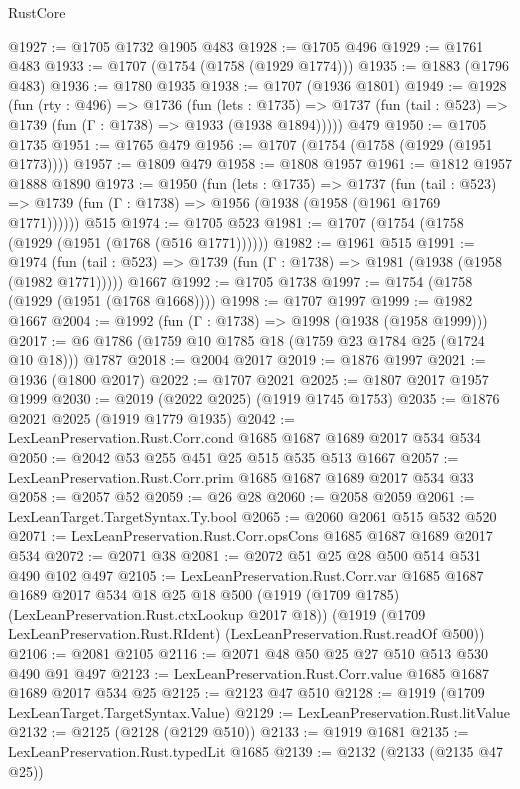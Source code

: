 \begin{lexlean}{RustCore}
\begin{coremodule}
@1927 := @1705 @1732 @1905 @483
@1928 := @1705 @496
@1929 := @1761 @483
@1933 := @1707 (@1754 (@1758 (@1929 @1774)))
@1935 := @1883 (@1796 @483)
@1936 := @1780 @1935
@1938 := @1707 (@1936 @1801)
@1949 := @1928
    (fun (rty : @496) =>
    @1736
      (fun (lets : @1735) =>
      @1737 (fun (tail : @523) => @1739 (fun (Γ : @1738) => @1933 (@1938 @1894)))))
    @479
@1950 := @1705 @1735
@1951 := @1765 @479
@1956 := @1707 (@1754 (@1758 (@1929 (@1951 @1773))))
@1957 := @1809 @479
@1958 := @1808 @1957
@1961 := @1812 @1957 @1888 @1890
@1973 := @1950
    (fun (lets : @1735) =>
    @1737
      (fun (tail : @523) => @1739 (fun (Γ : @1738) => @1956 (@1938 (@1958 (@1961 @1769 @1771))))))
    @515
@1974 := @1705 @523
@1981 := @1707 (@1754 (@1758 (@1929 (@1951 (@1768 (@516 @1771))))))
@1982 := @1961 @515
@1991 := @1974
    (fun (tail : @523) => @1739 (fun (Γ : @1738) => @1981 (@1938 (@1958 (@1982 @1771)))))
    @1667
@1992 := @1705 @1738
@1997 := @1754 (@1758 (@1929 (@1951 (@1768 @1668))))
@1998 := @1707 @1997
@1999 := @1982 @1667
@2004 := @1992 (fun (Γ : @1738) => @1998 (@1938 (@1958 @1999)))
@2017 := @6 @1786 (@1759 @10 @1785 @18 (@1759 @23 @1784 @25 (@1724 @10 @18))) @1787
@2018 := @2004 @2017
@2019 := @1876 @1997
@2021 := @1936 (@1800 @2017)
@2022 := @1707 @2021
@2025 := @1807 @2017 @1957 @1999
@2030 := @2019 (@2022 @2025) (@1919 @1745 @1753)
@2035 := @1876 @2021 @2025 (@1919 @1779 @1935)
@2042 := LexLeanPreservation.Rust.Corr.cond @1685 @1687 @1689 @2017 @534 @534
@2050 := @2042 @53 @255 @451 @25 @515 @535 @513 @1667
@2057 := LexLeanPreservation.Rust.Corr.prim @1685 @1687 @1689 @2017 @534 @33
@2058 := @2057 @52
@2059 := @26 @28
@2060 := @2058 @2059
@2061 := LexLeanTarget.TargetSyntax.Ty.bool
@2065 := @2060 @2061 @515 @532 @520
@2071 := LexLeanPreservation.Rust.Corr.opsCons @1685 @1687 @1689 @2017 @534
@2072 := @2071 @38
@2081 := @2072 @51 @25 @28 @500 @514 @531 @490 @102 @497
@2105 := LexLeanPreservation.Rust.Corr.var
    @1685
    @1687
    @1689
    @2017
    @534
    @18
    @25
    @18
    @500
    (@1919 (@1709 @1785) (LexLeanPreservation.Rust.ctxLookup @2017 @18))
    (@1919 (@1709 LexLeanPreservation.Rust.RIdent) (LexLeanPreservation.Rust.readOf @500))
@2106 := @2081 @2105
@2116 := @2071 @48 @50 @25 @27 @510 @513 @530 @490 @91 @497
@2123 := LexLeanPreservation.Rust.Corr.value @1685 @1687 @1689 @2017 @534 @25
@2125 := @2123 @47 @510
@2128 := @1919 (@1709 LexLeanTarget.TargetSyntax.Value)
@2129 := LexLeanPreservation.Rust.litValue
@2132 := @2125 (@2128 (@2129 @510))
@2133 := @1919 @1681
@2135 := LexLeanPreservation.Rust.typedLit @1685
@2139 := @2132 (@2133 (@2135 @47 @25))

\end{coremodule}
\end{lexlean}
